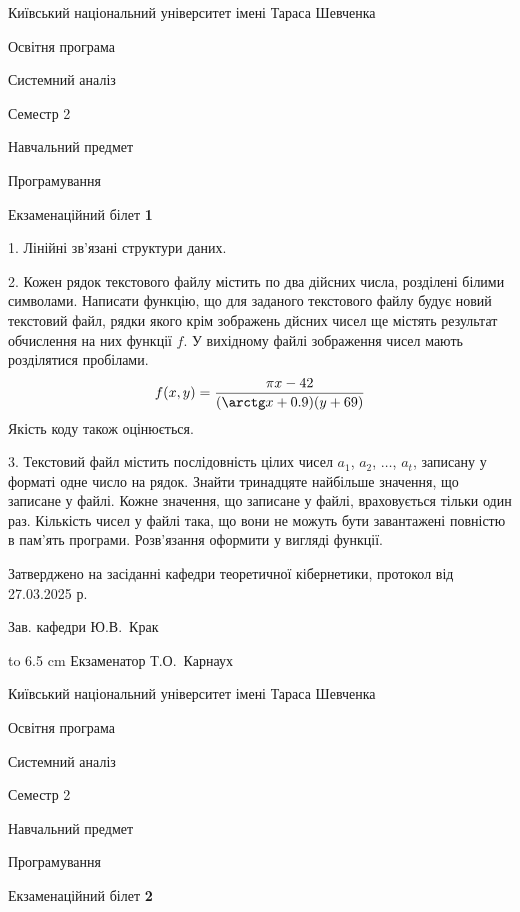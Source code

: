 \documentclass[12pt, ukrainian]{article}
\begin{document}
{{\begin {scriptsize}\par
{ \center  Київський національний університет імені Тараса Шевченка \par}
{\parbox {5 cm}{Освітня програма \hfill}{\parbox {7 cm}{Системний аналіз\hfill}}\parbox {6 cm}{\hfill Семестр 2}}\par
{\parbox {5 cm} {Навчальний предмет \hfill}\parbox {7 cm}{Програмування \hfill}\parbox {6cm}{\hfill}\par}\vspace{-15pt} \end{scriptsize}}{\center Екзаменаційний білет \No \textbf { 1 }\par}}
{%
1. Лінійні зв’язані структури даних.%
\par
\vspace{2mm}

2. Кожен рядок текстового файлу містить по два дійсних числа, розділені білими символами.
Написати функцію, що для заданого текстового файлу будує новий текстовий файл, рядки якого крім зображень дйсних чисел ще містять результат обчислення на них функції $f$. У вихідному файлі зображення чисел мають розділятися пробілами. 
$$f(x, y) =\frac{\pi x - 42}{(\arctg x + 0.9) (y + 69)}$$ 
Якість коду також оцінюється.

\par
\vspace{2mm}

3. Текстовий файл містить послідовність цілих чисел $a_1$, $a_2$, $\ldots$, $a_t$, записану у форматі одне число на рядок. Знайти тринадцяте найбільше значення, що записане у файлі. Кожне значення, що записане у файлі, враховується тільки один раз. Кількість чисел у файлі така, що вони не можуть бути завантажені повністю в пам'ять програми. Розв'язання оформити у вигляді функції.

}
{\smallskip\smallskip \begin {scriptsize} Затверджено на засіданні кафедри теоретичної кібернетики, протокол   від   27.03.2025 р.\par\smallskip\smallskip\smallskip\smallskip
{\parbox {6.5 cm} {Зав. кафедри \dotfill Ю.В.~Крак}}\hspace {0.7cm} {\hbox to 6.5 cm { Екзаменатор \dotfill Т.О.~Карнаух}} \end{scriptsize}}
\vspace{2.9cm}
{{\begin {scriptsize}\par
{ \center  Київський національний університет імені Тараса Шевченка \par}
{\parbox {5 cm}{Освітня програма \hfill}{\parbox {7 cm}{Системний аналіз\hfill}}\parbox {6 cm}{\hfill Семестр 2}}\par
{\parbox {5 cm} {Навчальний предмет \hfill}\parbox {7 cm}{Програмування \hfill}\parbox {6cm}{\hfill}\par}\vspace{-15pt} \end{scriptsize}}{\center Екзаменаційний білет \No \textbf { 2 }\par}}
\end{document}
